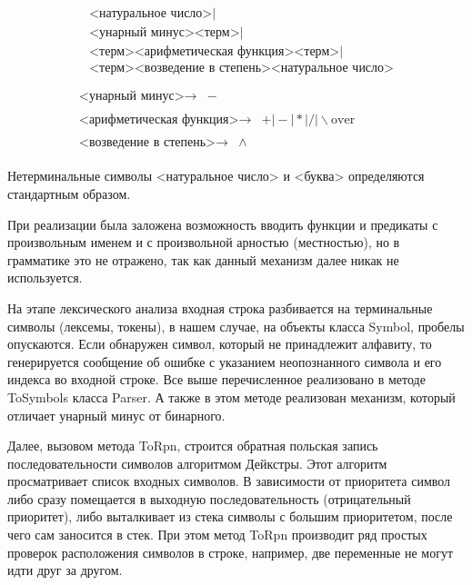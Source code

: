 \begin{equation*}
\begin{array}{l}
\begin{array}{ll}
            & \text{<натуральное число>} \textbf{|} \\
            & \text{<унарный минус>}\text{<терм>} \textbf{|} \\
            & \text{<терм>}\text{<арифметическая функция>}\text{<терм>} \textbf{|} \\
            & \text{<терм>}\text{<возведение в степень>}\text{<натуральное число>}\\
        \end{array} 
        \\
        \begin{array}{ll}
            \text{<унарный минус>}\rightarrow & -
        \end{array} \\ 
        \begin{array}{ll}
            \text{<арифметическая функция>}\rightarrow & + \textbf{|} - \textbf{|} * \textbf{|} / \textbf{|} \backslash \text{over}
        \end{array} \\ 
        \begin{array}{ll}
            \text{<возведение в степень>}\rightarrow & \wedge
        \end{array}
    \end{array}       
\end{equation*}

\begin{remark}
    Нетерминальные символы <натуральное число> и <буква> определяются стандартным образом.
\end{remark}

\begin{remark}
    При реализации была заложена возможность вводить функции и предикаты с произвольным именем и с произвольной арностью (местностью), но в грамматике это не отражено, так как данный механизм далее никак не используется.
\end{remark}

На этапе лексического анализа входная строка разбивается на терминальные символы (лексемы, токены), в нашем случае, на объекты класса Symbol, пробелы опускаются. Если обнаружен символ, который не принадлежит алфавиту, то генерируется сообщение об ошибке с указанием неопознанного символа и его индекса во входной строке. Все выше перечисленное реализовано в методе ToSymbols класса Parser. А также в этом методе реализован механизм, который отличает унарный минус от бинарного.

Далее, вызовом метода ToRpn, строится обратная польская запись последовательности символов алгоритмом Дейкстры. Этот алгоритм просматривает список входных символов. В зависимости от приоритета символ либо сразу помещается в выходную последовательность (отрицательный приоритет), либо выталкивает из стека символы с большим приоритетом, после чего сам заносится в стек. При этом метод ToRpn производит ряд простых проверок расположения символов в строке, например, две переменные не могут идти друг за другом.

